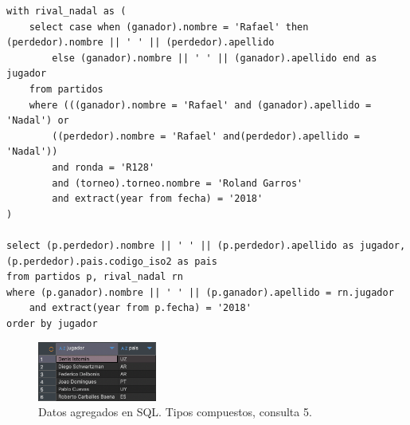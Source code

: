 \begin{verbatim}
with rival_nadal as (
	select case when (ganador).nombre = 'Rafael' then (perdedor).nombre || ' ' || (perdedor).apellido 
		else (ganador).nombre || ' ' || (ganador).apellido end as jugador
	from partidos 
	where (((ganador).nombre = 'Rafael' and (ganador).apellido = 'Nadal') or 
		((perdedor).nombre = 'Rafael' and(perdedor).apellido = 'Nadal'))
		and ronda = 'R128'
		and (torneo).torneo.nombre = 'Roland Garros'
		and extract(year from fecha) = '2018'
)

select (p.perdedor).nombre || ' ' || (p.perdedor).apellido as jugador, (p.perdedor).pais.codigo_iso2 as pais
from partidos p, rival_nadal rn
where (p.ganador).nombre || ' ' || (p.ganador).apellido = rn.jugador
	and extract(year from p.fecha) = '2018'
order by jugador
\end{verbatim}


\begin{figure}[H]
\centering
\includegraphics[width=0.35\textwidth]{fotos/q5_com.png}
\caption{Datos agregados en SQL. Tipos compuestos, consulta 5.}
\label{fig:q5_com}
\end{figure}
